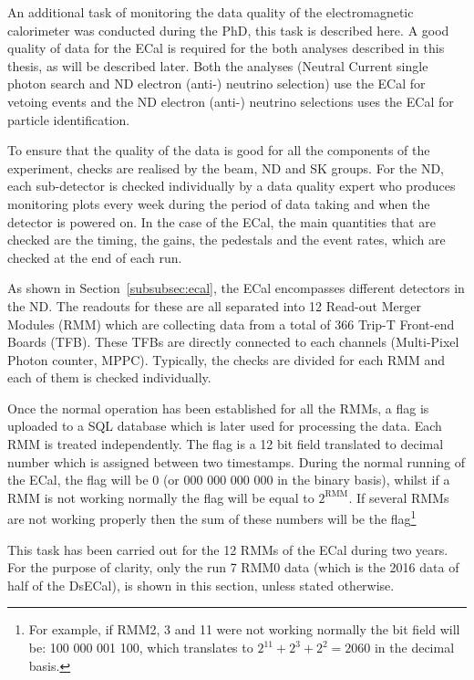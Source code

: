 

An additional task of monitoring the data quality of the
electromagnetic calorimeter was conducted during the PhD, this task is
described here. A good quality of data for the \Gls{ECal} is required
for the both analyses described in this thesis, as will be described
later. Both the analyses (Neutral Current single photon search and
\Gls{ND} electron (anti-) neutrino selection) use the \Gls{ECal} for
vetoing events and the \Gls{ND} electron (anti-) neutrino selections
uses the \Gls{ECal} for particle identification.

To ensure that the quality of the data is good for all the components
of the experiment, checks are realised by the beam, \Gls{ND} and
\Gls{SK} groups.  For the \Gls{ND}, each sub-detector is checked
individually by a data quality expert who produces monitoring plots
every week during the period of data taking and when the detector is
powered on. In the case of the \Gls{ECal}, the main quantities that
are checked are the timing, the gains, the pedestals and the event
rates, which are checked at the end of each run.

As shown in Section~\ref{subsubsec:ecal}, the \Gls{ECal} encompasses
different detectors in the \Gls{ND}. The readouts for these are all
separated into 12 Read-out Merger Modules (\Gls{RMM}) which are
collecting data from a total of 366 Trip-T Front-end Boards
(\Gls{TFB}). These \Glspl{TFB} are directly connected to each channels
(Multi-Pixel Photon counter, \Gls{MPPC}). Typically, the checks are
divided for each \Gls{RMM} and each of them is checked individually.

Once the normal operation has been established for all the
\Glspl{RMM}, a flag is uploaded to a SQL database which is later used
for processing the data. Each \Gls{RMM} is treated independently.  The
flag is a 12 bit field translated to decimal number which is assigned
between two timestamps. During the normal running of the \Gls{ECal},
the flag will be 0 (or 000 000 000 000 in the binary basis), whilst if
a \Gls{RMM} is not working normally the flag will be equal to
$2^{\text{RMM}}$. If several \Glspl{RMM} are not working properly then
the sum of these numbers will be the flag\footnote{For example, if
  \Gls{RMM}2, 3 and 11 were not working normally the bit field will
  be: 100 000 001 100, which translates to $2^{11}+2^{3}+2^{2}=2060$
  in the decimal basis.}

This task has been carried out for the 12 \Glspl{RMM} of the
\Gls{ECal} during two years. For the purpose of clarity, only the run
7 \Gls{RMM}0 data (which is the 2016 data of half of the
\Gls{DsECal}), is shown in this section, unless stated otherwise.

